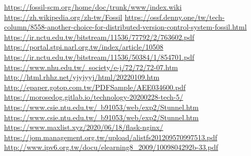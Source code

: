 \renewcommand\bibname{參考文獻}
\begin{thebibliography}{99}
\href{https://fossil-scm.org/home/doc/trunk/www/index.wiki}{https://fossil-scm.org/home/doc/trunk/www/index.wiki}
\href{https://zh.wikipedia.org/zh-tw/Fossil}{https://zh.wikipedia.org/zh-tw/Fossil}
\href{https://ossf.denny.one/tw/tech-column/8558-another-choice-for-distributed-version-control-system-fossil.html}{https://ossf.denny.one/tw/tech-column/8558-another-choice-for-distributed-version-control-system-fossil.html}
\href{https://ir.nctu.edu.tw/bitstream/11536/77792/2/763602.pdf}{https://ir.nctu.edu.tw/bitstream/11536/77792/2/763602.pdf}
\href{https://portal.stpi.narl.org.tw/index/article/10508}{https://portal.stpi.narl.org.tw/index/article/10508}
\href{https://ir.nctu.edu.tw/bitstream/11536/50384/1/854701.pdf}{https://ir.nctu.edu.tw/bitstream/11536/50384/1/854701.pdf}
\href{https://www.nhu.edu.tw/~society/e-j/72/72/72-07.htm}{https://www.nhu.edu.tw/~society/e-j/72/72/72-07.htm}
\href{http://html.rhhz.net/yjyjyyj/html/20220109.htm}{http://html.rhhz.net/yjyjyyj/html/20220109.htm}
\href{http://epaper.gotop.com.tw/PDFSample/AEE034600.pdf}{http://epaper.gotop.com.tw/PDFSample/AEE034600.pdf}
\href{https://morosedog.gitlab.io/technology-20200228-tech-5/}{https://morosedog.gitlab.io/technology-20200228-tech-5/}
\href{https://www.csie.ntu.edu.tw/~b91053/web/exp2/Stunnel.htm}{https://www.csie.ntu.edu.tw/~b91053/web/exp2/Stunnel.htm}
\href{https://www.csie.ntu.edu.tw/~b91053/web/exp2/Stunnel.htm}{https://www.csie.ntu.edu.tw/~b91053/web/exp2/Stunnel.htm}
\href{https://www.maxlist.xyz/2020/06/18/flask-nginx/}{https://www.maxlist.xyz/2020/06/18/flask-nginx/}
\href{https://jom.management.org.tw/upload/alistfs201209570997513.pdf}{https://jom.management.org.tw/upload/alistfs201209570997513.pdf}
\href{http://www.ipv6.org.tw/docu/elearning8\_2009/1009804292b-33.pdf}{http://www.ipv6.org.tw/docu/elearning8\_2009/1009804292b-33.pdf}

\end{thebibliography}
